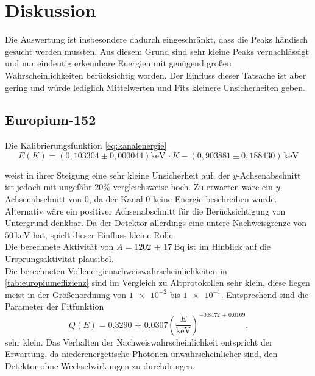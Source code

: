 \section{Diskussion}
\label{sec:Diskussion}

Die Auswertung ist insbesondere dadurch eingeschränkt, dass die Peaks händisch gesucht werden mussten. Aus diesem Grund sind sehr kleine Peaks vernachlässigt
und nur eindeutig erkennbare Energien mit genügend großen Wahrscheinlichkeiten berücksichtig worden. Der Einfluss dieser Tatsache ist aber gering und würde lediglich Mittelwerten und Fits kleinere Unsicherheiten geben.

\subsection{Europium-152}

Die Kalibrierungsfunktion \eqref{eq:kanalenergie}
\begin{equation}
    E(K) = (0,103304 \pm 0,000044) \si{\kilo\electronvolt} \, \cdot K - (0,903881 \pm 0,188430) \, \si{\kilo\electronvolt}
\end{equation}

weist in ihrer Steigung eine sehr kleine Unsicherheit auf, der $y$-Achsenabschnitt ist jedoch mit ungefähr $20 \%$ vergleichsweise hoch.
Zu erwarten wäre ein $y$-Achsenabschnitt von $0$, da der Kanal $0$ keine Energie beschreiben würde. Alternativ wäre ein positiver Achsenabschnitt
für die Berücksichtigung von Untergrund denkbar. Da der Detektor allerdings eine untere Nachweisgrenze von $\qty{50}{\kilo\electronvolt}$ hat, spielt dieser Einfluss kleine Rolle.\\

Die berechnete Aktivität von $A = \qty{1202(17)}{\becquerel}$ ist im Hinblick auf die Ursprungsaktivität plausibel.\\

Die berechneten Vollenergienachweiswahrscheinlichkeiten in \ref{tab:europiumeffizienz} sind im Vergleich zu Altprotokollen sehr klein, diese liegen meist in der Größenordnung von $\num{1e-2}$ bis $\num{1e-1}$. Entsprechend sind die Parameter
der Fitfunktion
\begin{equation}
    Q(E) = \num{0.3290(307)} (\frac{E}{\si{\kilo\electronvolt}})^{\num{-0.8472(169)}}.
\end{equation}
sehr klein. Das Verhalten der Nachweiswahrscheinlichkeit entspricht der Erwartung, da niederenergetische Photonen unwahrscheinlicher sind, den Detektor ohne Wechselwirkungen zu durchdringen.\\

